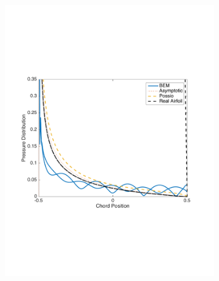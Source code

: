 \documentclass{article}
\begin{document}
\newpage
\begin{figure}[h]
\centering
\begin{subfigure}{0.3\textwidth}
	\centering
	\includegraphics[width = \textwidth, height=0.2\textheight]{pressure_k15mag}
\end{subfigure}%
\begin{subfigure}{0.3\textwidth}
	\centering

\end{subfigure}
\end{figure}
\end{document}
